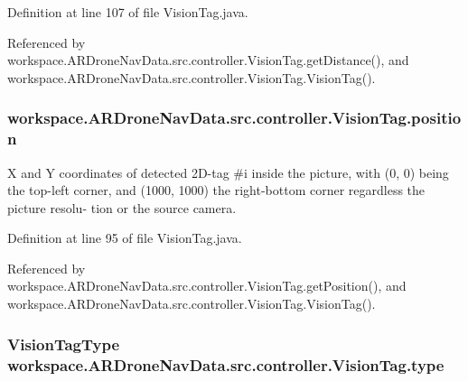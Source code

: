 Definition at line 107 of file Vision\+Tag.\+java.



Referenced by workspace.\+A\+R\+Drone\+Nav\+Data.\+src.\+controller.\+Vision\+Tag.\+get\+Distance(), and workspace.\+A\+R\+Drone\+Nav\+Data.\+src.\+controller.\+Vision\+Tag.\+Vision\+Tag().

\hypertarget{classworkspace_1_1_a_r_drone_nav_data_1_1src_1_1controller_1_1_vision_tag_a686c10334c973d285ec00b7f3282807a}{}
\subsubsection[{position}]{ workspace.\+A\+R\+Drone\+Nav\+Data.\+src.\+controller.\+Vision\+Tag.\+position\hspace{0.3cm}{\ttfamily [private]}}\label{classworkspace_1_1_a_r_drone_nav_data_1_1src_1_1controller_1_1_vision_tag_a686c10334c973d285ec00b7f3282807a}
X and Y coordinates of detected 2\+D-\/tag \#i inside the picture, with (0, 0) being the top-\/left corner, and (1000, 1000) the right-\/bottom corner regardless the picture resolu-\/ tion or the source camera. 

Definition at line 95 of file Vision\+Tag.\+java.



Referenced by workspace.\+A\+R\+Drone\+Nav\+Data.\+src.\+controller.\+Vision\+Tag.\+get\+Position(), and workspace.\+A\+R\+Drone\+Nav\+Data.\+src.\+controller.\+Vision\+Tag.\+Vision\+Tag().

\hypertarget{classworkspace_1_1_a_r_drone_nav_data_1_1src_1_1controller_1_1_vision_tag_ae12a8ea0f00181dc4a32ba896e8966b8}{}
\subsubsection[{type}]{\setlength{\rightskip}{0pt plus 5cm}Vision\+Tag\+Type workspace.\+A\+R\+Drone\+Nav\+Data.\+src.\+controller.\+Vision\+Tag.\+type\hspace{0.3cm}{\ttfamily [private]}}\label{classworkspace_1_1_a_r_drone_nav_data_1_1src_1_1controller_1_1_vision_tag_ae12a8ea0f00181dc4a32ba896e8966b8}



